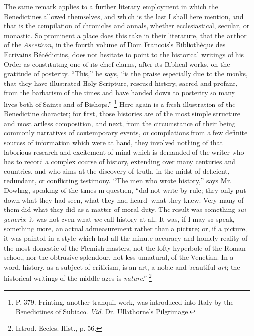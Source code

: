 The same remark applies to a further literary employment in which
the Benedictines allowed themselves, and which is the last I shall
here mention, and that is the compilation of chronicles and annals,
whether ecclesiastical, secular, or monastic. So prominent a place
does this take in their literature, that the author of the \emph{Asceticon},
in the fourth volume of Dom Francois's Bibliothèque des Ecrivains
Bénédictins, does not hesitate to point to the historical writings
of his Order as constituting one of its chief claims, after its
Biblical works, on the gratitude of posterity. ``This,'' he
says, ``is the praise especially due to the monks, that they have
illustrated Holy Scripture, rescued history, sacred and profane, from
the barbarism of the times and have handed down to posterity so
many lives both of Saints and of Bishops.'' \footnote{P. 379.
Printing, another tranquil work, was introduced into Italy by the
Benedictines of Subiaco. \emph{Vid}. Dr. Ullathorne's Pilgrimage.} Here again is a fresh illustration of the Benedictine
character; for first, those histories are of the most simple structure
and most artless composition, and next, from the circumstance of their
being commonly narratives of contemporary events, or compilations from
a few definite sources of information which were at hand, they
involved nothing of that laborious research and excitement of mind
which is demanded of the writer who has to record a complex course of
history, extending over many centuries and countries, and who aims at
the discovery of truth, in the midst of deficient, redundant, or
conflicting testimony. ``The men who wrote history,'' says Mr.
Dowling, speaking of the times in question, ``did not write by
rule; they only put down what they had seen, what they had heard, what
they knew. Very many of them did what they did as a matter of moral
duty. The result was something \emph{sui generis}; it was not even
what \emph{we} call history at all. It was, if I may so speak,
something more, an actual admeasurement rather than a picture; or, if
a picture, it was painted in a style which had all the minute accuracy
and homely reality of the most domestic of the Flemish masters, not
the lofty hyperbole of the Roman school, nor the obtrusive splendour,
not less unnatural, of the Venetian. In a word, history, as a subject
of criticism, is an art, a noble and beautiful \emph{art}; the
historical writings of the middle ages is \emph{nature}.'' \footnote{Introd.
Eccles. Hist., p. 56.}

